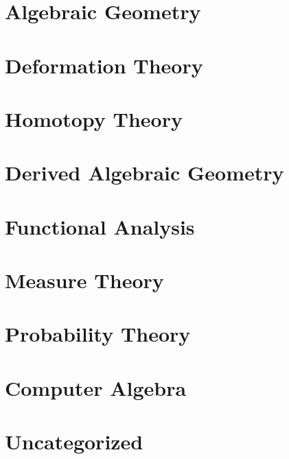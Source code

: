 \documentclass{report}
\begin{document}
\chapter{Algebraic Geometry}
\renewcommand{\cat}{AG}








\chapter{Deformation Theory}
\renewcommand{\cat}{DT}


\chapter{Homotopy Theory}
\renewcommand{\cat}{HT}




\chapter{Derived Algebraic Geometry}
\renewcommand{\cat}{DAG}


\chapter{Functional Analysis}
\renewcommand{\cat}{FA}


\chapter{Measure Theory}
\renewcommand{\cat}{MT}


\chapter{Probability Theory}
\renewcommand{\cat}{PT}


\chapter{Computer Algebra}
\renewcommand{\cat}{CP}


\chapter{Uncategorized}
\renewcommand{\cat}{UN}

\end{document}
